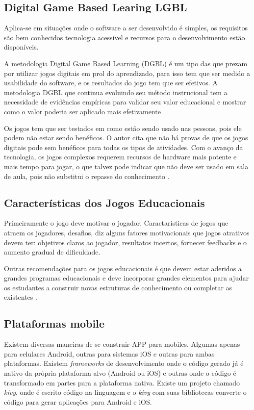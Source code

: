 \subsection[Digital Game Based Learing LGBL]{Digital Game Based Learing LGBL}
Aplica-se em situações onde o software a ser desenvolvido é simples, os requisitos são bem conhecidos tecnologia acessível e recursos para o desenvolvimento estão disponíveis.

A metodologia Digital Game Based Learning (DGBL) é um tipo das que prezam por utilizar jogos digitais em prol do aprendizado, para isso tem que ser medido a usabilidade do software, e os resultados do jogo tem que ser efetivos.
A metodologia DGBL que continua evoluindo seu método instrucional tem a necessidade de evidências empíricas para validar seu valor educacional e mostrar como o valor poderia ser aplicado mais efetivamente \cite{jogoSuporteMat}.


Os jogos tem que ser testados em como estão sendo usado nas pessoas, pois ele podem não estar sendo benéficos. 
O autor cita que não há provas de que os jogos digitais pode sem benéficos para todas os tipos de atividades.
Com o avanço da tecnologia, os jogos complexos requerem recursos de hardware mais potente e mais tempo para jogar, o que talvez pode indicar que não deve ser usado em sala de aula, pois não substitui o repasse do conhecimento \cite{jogoSuporteMat}.


\subsection[Características dos Jogos Educacionais]{Características dos Jogos Educacionais}
Primeiramente o jogo deve motivar o jogador. Caractarísticas de jogos que atraem os jogadores, desafios, 
\cite{jogoSuporteMat} diz alguns fatores motivacionais que jogos atrativos devem ter: objetivos claros ao jogador, resultatos incertos, fornecer feedbacks e o aumento gradual de dificuldade.

Outras recomendações para os jogos educacionais é que devem estar aderidos a grandes programas educacionais e deve incorporar grandes elementos para ajudar os estudantes a construir novas estruturas de conhecimento ou completar as existentes \cite{jogoSuporteMat}.

\subsection[Plataformas mobile]{Plataformas mobile}
Existem diversas maneiras de se construir APP para mobiles. Algumas apenas para celulares Android, outras para sistemas iOS e outras para ambas plataformas. Existem \textit{frameworks} de desenvolvimento onde o código gerado já é nativo da própria plataforma alvo (Android ou iOS) e outras onde o código é transformado em partes para a plataforma nativa.
Existe um  projeto chamado \textit{kivy}, onde é escrito código na linguagem  e o \textit{kivy} com suas bibliotecas converte o código para gerar aplicações para Android e iOS.

